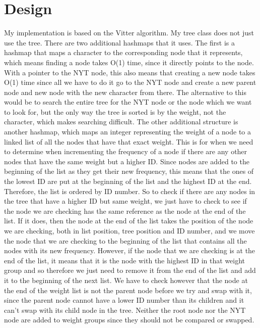 \documentclass[12pt, letterpaper]{article}
\begin{document}
\section{Design}
My implementation is based on the Vitter algorithm. My tree class does not just use the tree. There are two additional hashmaps that it uses. The first is a hashmap that maps a character to the corresponding node that it represents, which means finding a node takes O(1) time, since it directly points to the node. With a pointer to the NYT node, this also means that creating a new node takes O(1) time since all we have to do it go to the NYT node and create a new parent node and new node with the new character from there. The alternative to this would be to search the entire tree for the NYT node or the node which we want to look for, but the only way the tree is sorted is by the weight, not the character, which makes searching difficult.
\newline \newline
The other additional structure is another hashmap, which maps an integer representing the weight of a node to a linked list of all the nodes that have that exact weight. This is for when we need to determine when incrementing the frequency of a node if there are any other nodes that have the same weight but a higher ID. Since nodes are added to the beginning of the list as they get their new frequency, this means that the ones of the lowest ID are put at the beginning of the list and the highest ID at the end. Therefore, the list is ordered by ID number. So to check if there are any nodes in the tree that have a higher ID but same weight, we just have to check to see if the node we are checking has the same reference as the node at the end of the list. If it does, then the node at the end of the list takes the position of the node we are checking, both in list position, tree position and ID number, and we move the node that we are checking to the beginning of the list that contains all the nodes with its new frequency. However, if the node that we are checking is at the end of the list, it means that it is the node with the highest ID in that weight group and so therefore we just need to remove it from the end of the list and add it to the beginning of the next list. We have to check however that the node at the end of the weight list is not the parent node before we try and swap with it, since the parent node cannot have a lower ID number than its children and it can't swap with its child node in the tree. Neither the root node nor the NYT node are added to weight groups since they should not be compared or swapped.
\end{document}
